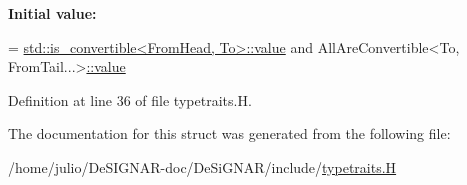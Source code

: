 {\bfseries Initial value\+:}
\begin{DoxyCode}
=
      \hyperlink{namespace_designar_a7dd2a7b6d96f664ce612b506c8eb2fb8}{std::is\_convertible<FromHead, To>::value} and
      AllAreConvertible<To, FromTail...>\hyperlink{struct_designar_1_1_all_are_convertible_a698b71c73875452298bc2e96935240c3}{::value}
\end{DoxyCode}


Definition at line 36 of file typetraits.\+H.



The documentation for this struct was generated from the following file\+:\begin{DoxyCompactItemize}
\item 
/home/julio/\+De\+S\+I\+G\+N\+A\+R-\/doc/\+De\+Si\+G\+N\+A\+R/include/\hyperlink{typetraits_8_h}{typetraits.\+H}\end{DoxyCompactItemize}
